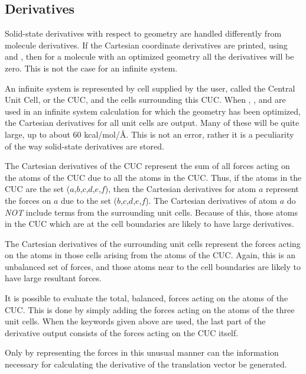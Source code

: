 \subsection{Derivatives}
Solid-state derivatives with respect to geometry are handled differently from
molecule derivatives.  If the Cartesian coordinate derivatives are printed,
using  and , then for a molecule with an  optimized
geometry all the derivatives will be zero.  This is  not the case for an
infinite system.

An infinite system is represented by cell supplied by the user, called the
Central Unit Cell, or the CUC, and the cells surrounding this CUC. When
, , and  are used in an infinite system
calculation for which  the geometry has been optimized, the Cartesian
derivatives for all unit cells are output. Many of these will be quite large,
up to about 60 kcal/mol/\AA .  This is not an error, rather it is a peculiarity
of the way solid-state derivatives are stored.

The Cartesian derivatives of the CUC represent the sum of all forces acting on
the atoms of the CUC due to all the atoms in the CUC.  Thus, if the atoms in
the CUC are the set ($a$,$b$,$c$,$d$,$e$,$f$), then the Cartesian  derivatives
for atom $a$ represent the forces on $a$ due to the set
($b$,$c$,$d$,$e$,$f$).  The Cartesian derivatives of atom $a$ do {\em NOT}
include terms from  the surrounding unit cells.  Because of this, those atoms
in the CUC  which are at the cell boundaries are likely to have large
derivatives.

The Cartesian derivatives of the surrounding unit cells represent the  forces
acting on the atoms in those cells arising from the atoms of the CUC.  Again,
this is an unbalanced set of forces, and those atoms near to the cell
boundaries are likely to have large resultant forces.

It is possible to evaluate the total, balanced, forces acting on the atoms of
the CUC.  This is done by simply adding the forces acting on the atoms of the
three unit cells.  When the keywords given above are used, the last part of the
derivative output consists of the forces acting on the CUC itself.

Only by representing the forces in this unusual manner can the information
necessary for calculating the derivative of the translation vector be
generated.


